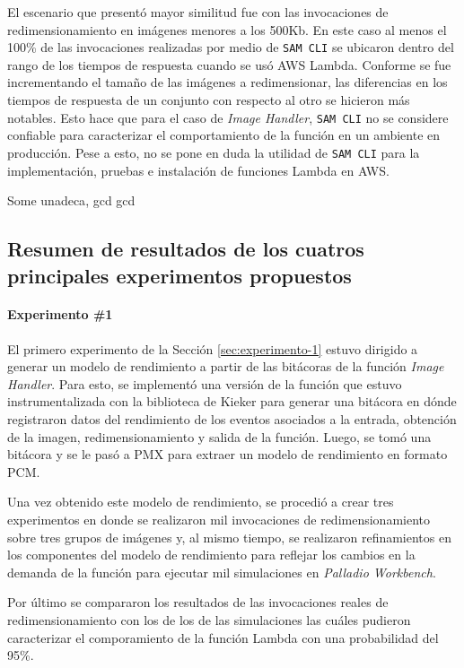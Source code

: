 El escenario que presentó mayor similitud fue con las invocaciones de redimensionamiento en imágenes menores a los 500Kb. En este caso al menos el 100\% de las invocaciones realizadas por medio de \texttt{SAM CLI} se ubicaron dentro del rango de los tiempos de respuesta cuando se usó AWS Lambda. Conforme se fue incrementando el tamaño de las imágenes a redimensionar, las diferencias en los tiempos de respuesta de un conjunto con respecto al otro se hicieron más notables. Esto hace que para el caso de \emph{Image Handler}, \texttt{SAM CLI} no se considere confiable para caracterizar el comportamiento de la función en un ambiente en producción. Pese a esto, no se pone en duda la utilidad de \texttt{SAM CLI} para la implementación, pruebas e instalación de funciones Lambda en AWS.

Some \gls{unadeca}, \acrlong{gcd} \acrshort{gcd}


\subsection{Resumen de resultados de los cuatros principales experimentos propuestos}
\paragraph{Experimento \#1} El primero experimento de la Sección \ref{sec:experimento-1} estuvo dirigido a generar un modelo de rendimiento a partir de las bitácoras de la función \emph{Image Handler}. Para esto, se implementó una versión de la función que estuvo instrumentalizada con la biblioteca de Kieker para generar una bitácora en dónde registraron datos del rendimiento de los eventos asociados a la entrada, obtención de la imagen, redimensionamiento y salida de la función. Luego, se tomó una bitácora y se le pasó a PMX para extraer un modelo de rendimiento en formato PCM. 

Una vez obtenido este modelo de rendimiento, se procedió a crear tres experimentos en donde se realizaron mil invocaciones de redimensionamiento sobre tres grupos de imágenes y, al mismo tiempo, se realizaron refinamientos en los componentes del modelo de rendimiento para reflejar los cambios en la demanda de la función para ejecutar mil simulaciones en \emph{Palladio Workbench}.

Por último se compararon los resultados de las invocaciones reales de redimensionamiento con los de los de las simulaciones las cuáles pudieron caracterizar el comporamiento de la función Lambda con una probabilidad del 95\%. 

